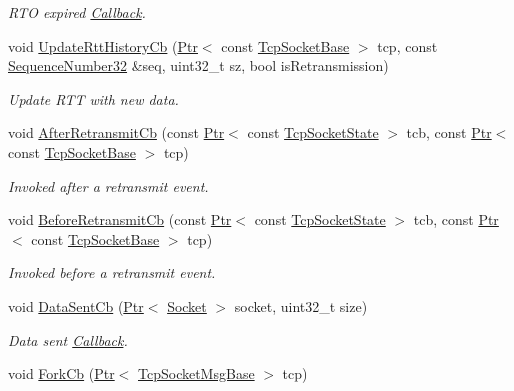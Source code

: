 \begin{DoxyCompactItemize}
\begin{DoxyCompactList}\small\item\em R\+TO expired \hyperlink{classns3_1_1Callback}{Callback}. \end{DoxyCompactList}\item 
void \hyperlink{classns3_1_1TcpGeneralTest_aef935b668f7db609305f453087d40966}{Update\+Rtt\+History\+Cb} (\hyperlink{classns3_1_1Ptr}{Ptr}$<$ const \hyperlink{classns3_1_1TcpSocketBase}{Tcp\+Socket\+Base} $>$ tcp, const \hyperlink{group__network_gacb2070e4e98d2d5135c9bede58f07a03}{Sequence\+Number32} \&seq, uint32\+\_\+t sz, bool is\+Retransmission)
\begin{DoxyCompactList}\small\item\em Update R\+TT with new data. \end{DoxyCompactList}\item 
void \hyperlink{classns3_1_1TcpGeneralTest_aa119f161a2d35ec94e5300106a8a41a7}{After\+Retransmit\+Cb} (const \hyperlink{classns3_1_1Ptr}{Ptr}$<$ const \hyperlink{classns3_1_1TcpSocketState}{Tcp\+Socket\+State} $>$ tcb, const \hyperlink{classns3_1_1Ptr}{Ptr}$<$ const \hyperlink{classns3_1_1TcpSocketBase}{Tcp\+Socket\+Base} $>$ tcp)
\begin{DoxyCompactList}\small\item\em Invoked after a retransmit event. \end{DoxyCompactList}\item 
void \hyperlink{classns3_1_1TcpGeneralTest_a2a5aa7f1b52a034310efacad6febce88}{Before\+Retransmit\+Cb} (const \hyperlink{classns3_1_1Ptr}{Ptr}$<$ const \hyperlink{classns3_1_1TcpSocketState}{Tcp\+Socket\+State} $>$ tcb, const \hyperlink{classns3_1_1Ptr}{Ptr}$<$ const \hyperlink{classns3_1_1TcpSocketBase}{Tcp\+Socket\+Base} $>$ tcp)
\begin{DoxyCompactList}\small\item\em Invoked before a retransmit event. \end{DoxyCompactList}\item 
void \hyperlink{classns3_1_1TcpGeneralTest_aaf751b4a72b2e465d4f0d32b2ebf638a}{Data\+Sent\+Cb} (\hyperlink{classns3_1_1Ptr}{Ptr}$<$ \hyperlink{classns3_1_1Socket}{Socket} $>$ socket, uint32\+\_\+t size)
\begin{DoxyCompactList}\small\item\em Data sent \hyperlink{classns3_1_1Callback}{Callback}. \end{DoxyCompactList}\item 
void \hyperlink{classns3_1_1TcpGeneralTest_a57a992563211b8457712d4e3d92d5b04}{Fork\+Cb} (\hyperlink{classns3_1_1Ptr}{Ptr}$<$ \hyperlink{classns3_1_1TcpSocketMsgBase}{Tcp\+Socket\+Msg\+Base} $>$ tcp)

\end{DoxyCompactItemize}
